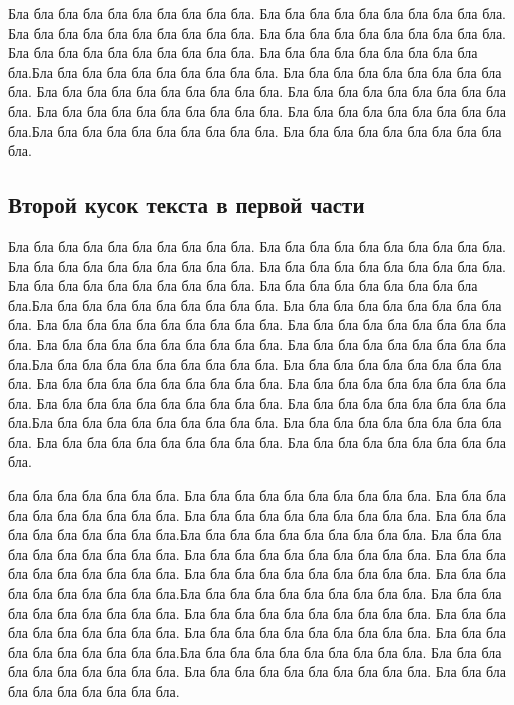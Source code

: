 \documentclass[12pt,a4paper, oneside]{report}
\begin{document}
Бла бла бла бла бла бла бла бла бла бла. Бла бла бла бла бла бла бла бла бла бла. Бла бла бла бла бла бла бла бла бла бла. Бла бла бла бла бла бла бла бла бла бла. Бла бла бла бла бла бла бла бла бла бла. Бла бла бла бла бла бла бла бла бла бла.Бла бла бла бла бла бла бла бла бла бла. Бла бла бла бла бла бла бла бла бла бла. Бла бла бла бла бла бла бла бла бла бла. Бла бла бла бла бла бла бла бла бла бла. Бла бла бла бла бла бла бла бла бла бла. Бла бла бла бла бла бла бла бла бла бла.Бла бла бла бла бла бла бла бла бла бла. Бла бла бла бла бла бла бла бла бла бла.

\subsection{Второй кусок текста в первой части}
Бла бла бла бла бла бла бла бла бла бла. Бла бла бла бла бла бла бла бла бла бла. Бла бла бла бла бла бла бла бла бла бла. Бла бла бла бла бла бла бла бла бла бла. Бла бла бла бла бла бла бла бла бла бла. Бла бла бла бла бла бла бла бла бла бла.Бла бла бла бла бла бла бла бла бла бла. Бла бла бла бла бла бла бла бла бла бла. Бла бла бла бла бла бла бла бла бла бла. Бла бла бла бла бла бла бла бла бла бла. Бла бла бла бла бла бла бла бла бла бла. Бла бла бла бла бла бла бла бла бла бла.Бла бла бла бла бла бла бла бла бла бла. Бла бла бла бла бла бла бла бла бла бла. Бла бла бла бла бла бла бла бла бла бла. Бла бла бла бла бла бла бла бла бла бла. Бла бла бла бла бла бла бла бла бла бла. Бла бла бла бла бла бла бла бла бла бла.Бла бла бла бла бла бла бла бла бла бла. Бла бла бла бла бла бла бла бла бла бла. Бла бла бла бла бла бла бла бла бла бла. Бла бла бла бла бла бла бла бла бла бла.

бла бла бла бла бла бла бла. Бла бла бла бла бла бла бла бла бла бла. Бла бла бла бла бла бла бла бла бла бла. Бла бла бла бла бла бла бла бла бла бла. Бла бла бла бла бла бла бла бла бла бла.Бла бла бла бла бла бла бла бла бла бла. Бла бла бла бла бла бла бла бла бла бла. Бла бла бла бла бла бла бла бла бла бла. Бла бла бла бла бла бла бла бла бла бла. Бла бла бла бла бла бла бла бла бла бла. Бла бла бла бла бла бла бла бла бла бла.Бла бла бла бла бла бла бла бла бла бла. Бла бла бла бла бла бла бла бла бла бла. Бла бла бла бла бла бла бла бла бла бла. Бла бла бла бла бла бла бла бла бла бла. Бла бла бла бла бла бла бла бла бла бла. Бла бла бла бла бла бла бла бла бла бла.Бла бла бла бла бла бла бла бла бла бла. Бла бла бла бла бла бла бла бла бла бла. Бла бла бла бла бла бла бла бла бла бла. Бла бла бла бла бла бла бла бла бла бла.
\end{document}

